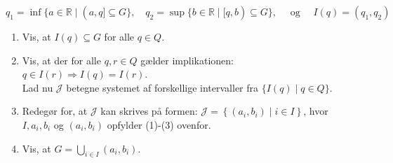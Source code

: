\documentclass{Class}
\begin{document}
$$
q_1=\inf \{a \in \mathbb{R} \mid(a, q] \subseteq G\}, \quad q_2=\sup \{b \in \mathbb{R} \mid[q, b) \subseteq G\}, \quad \text { og } \quad I(q)=\left(q_1, q_2\right)
$$
\begin{enumerate}
    \item Vis, at $I(q) \subseteq G$ for alle $q \in Q$.
    \item Vis, at der for alle $q, r \in Q$ gælder implikationen: $q \in I(r) \Longrightarrow I(q)=I(r)$.
    \\Lad nu $\mathcal{J}$ betegne systemet af forskellige intervaller fra $\{I(q) \mid q \in Q\}$.
    \item Redegør for, at $\mathcal{J}$ kan skrives på formen: $\mathcal{J}=\left\{\left(a_i, b_i\right) \mid i \in I\right\}$, hvor $I, a_i, b_i$ og $\left(a_i, b_i\right)$ opfylder (1)-(3) ovenfor.
    \item Vis, at $G=\bigcup_{i \in I}\left(a_i, b_i\right)$.
\end{enumerate}
\solution
\end{document}
